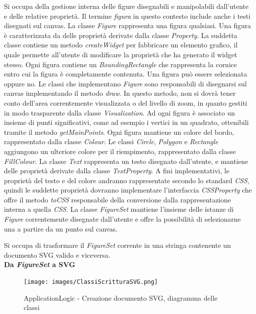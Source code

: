 Si occupa della gestione interna delle figure disegnabili e manipolabili dall'utente e delle relative propriet\`a. Il termine \textit{figura} in questo contesto include anche i testi disegnati sul canvas. La classe \textit{Figure} rappresenta una figura qualsiasi. Una figura \`e caratterizzata da delle propriet\`a derivate dalla classe \textit{Property}. La suddetta classe contiene un metodo \textit{createWidget} per fabbricare un elemento grafico, il quale permette all'utente di modificare la propriet\`a che ha generato il widget stesso. Ogni figura contiene un \textit{BoundingRectangle} che rappresenta la cornice entro cui la figura \`e completamente contenuta. Una figura pu\`o essere selezionata oppure no. Le classi che implementano \textit{Figure} sono responsabili di disegnarsi sul canvas implementando il metodo \textit{draw}. In questo metodo, non si dovr\`a tener conto dell'area correntemente visualizzata o del livello di zoom, in quanto gestiti in modo trasparente dalla classe \textit{Visualization}. Ad ogni figura \`e associato un insieme di punti significativi, come ad esempio i vertici in un quadrato, ottenibili tramite il metodo \textit{getMainPoints}. Ogni figura mantiene un colore del bordo, rappresentato dalla classe \textit{Colour}. Le classi \textit{Circle}, \textit{Polygon} e \textit{Rectangle} aggiungono un ulteriore colore per il riempimento, rappresentato dalla classe \textit{FillColour}. La classe \textit{Text} rappresenta un testo disegnato dall'utente, e mantiene delle propriet\`a derivate dalla classe \textit{TextProperty}. A fini implementativi, le propriet\`a del testo e del colore andranno rappresentate secondo lo standard \textit{CSS}, quindi le suddette propriet\`a dovranno implementare l'interfaccia \textit{CSSProperty} che offre il metodo \textit{toCSS} responsabile della conversione dalla rappresentazione interna a quella \textit{CSS}. La classe \textit{FigureSet} mantiene l'insieme delle istanze di \textit{Figure} correntemente disegnate dall'utente e offre la possibilit\`a di selezionarne una a partire da un punto sul canvas.

\newpage
{}
Si occupa di trasformare il \textit{FigureSet} corrente in una stringa 
contenente un documento SVG valido e viceversa.  \\


\textbf{Da \textit{FigureSet} a SVG}

\begin{figure}[!ht]
\centering
\texttt{[image: images/ClassiScritturaSVG.png]}
\caption{ApplicationLogic - Creazione documento SVG, diagramma delle classi}
\end{figure}

